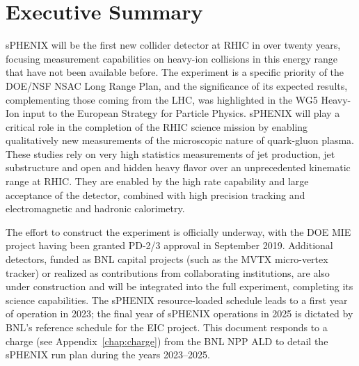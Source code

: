 \chapter*{Executive Summary}
\label{executive_summary}
\setcounter{page}{1}

sPHENIX will be the first new collider detector at RHIC in over twenty
years, focusing measurement capabilities on heavy-ion collisions in
this energy range that have not been available before.  The experiment
is a specific priority of the DOE/NSF NSAC Long Range Plan, and the
significance of its expected results, complementing those coming from
the LHC, was highlighted in the WG5 Heavy-Ion input to the European
Strategy for Particle Physics.  sPHENIX will play a critical role in
the completion of the RHIC science mission by enabling qualitatively
new measurements of the microscopic nature of quark-gluon plasma.
These studies rely on very high statistics measurements of jet
production, jet substructure and open and hidden heavy flavor over an
unprecedented kinematic range at RHIC.  They are enabled by the high
rate capability and large acceptance of the detector, combined with
high precision tracking and electromagnetic and hadronic calorimetry.

The effort to construct the experiment is officially underway, with
the DOE MIE project having been granted PD-2/3 approval in September
2019.  Additional detectors, funded as BNL capital projects (such as
the MVTX micro-vertex tracker) or realized as contributions from
collaborating institutions, are also under construction and will be
integrated into the full experiment, completing its science
capabilities.  The sPHENIX resource-loaded schedule leads to a first
year of operation in 2023; the final year of sPHENIX operations in
2025 is dictated by BNL's reference schedule for the EIC project.
This document responds to a charge (see Appendix~\ref{chap:charge})
from the BNL NPP ALD to detail the sPHENIX run plan during the years
2023--2025.

